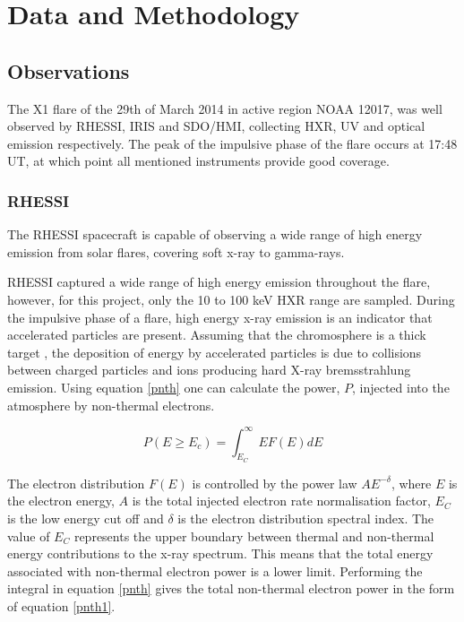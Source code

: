 \section{Data and Methodology}
\subsection{Observations}
The X1 flare of the 29th of March 2014 in active region NOAA 12017, was well observed by RHESSI, IRIS and SDO/HMI, collecting HXR, UV and optical emission respectively. The peak of the impulsive phase of the flare occurs at 17:48 UT, at which point all mentioned instruments provide good coverage. 

\subsubsection{RHESSI}
The RHESSI spacecraft is capable of observing a wide range of high energy emission from solar flares, covering soft x-ray to gamma-rays. 


RHESSI captured a wide range of high energy emission throughout the flare, however, for this project, only the 10 to 100 keV HXR range are sampled. During the impulsive phase of a flare, high energy x-ray emission is an indicator that accelerated particles are present. Assuming that the chromosphere is a thick target \citep{1971SoPh...18..489B}, the deposition of energy by accelerated particles is due to collisions between charged particles and ions producing hard X-ray bremsstrahlung emission. Using equation \ref{pnth} one can calculate the power, $P$, injected into the atmosphere by non-thermal electrons.  
 
\begin{equation}\label{pnth}
P(E \geq E_{c}) = \int_{E_{C}}^{\infty} EF(E)dE
\end{equation}

The electron distribution $F(E)$ is controlled by the power law $AE^{-\delta}$, where $E$ is the electron energy, $A$ is the total injected electron rate normalisation factor, $E_{C}$ is the low energy cut off and $\delta$ is the electron distribution spectral index. The value of $E_{C}$ represents the upper boundary between thermal and non-thermal energy contributions to the x-ray spectrum. This means that the total energy associated with non-thermal electron power is a lower limit.  Performing the integral in equation \ref{pnth} gives the total non-thermal electron power in the form of equation \ref{pnth1}.

